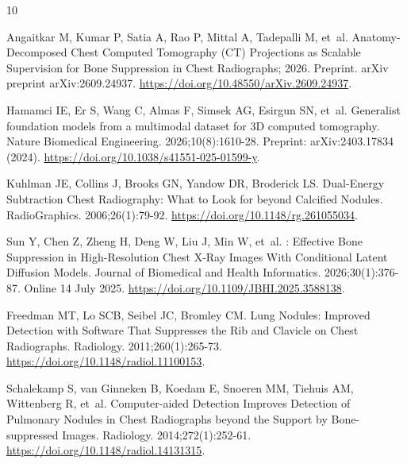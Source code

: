 \begin{thebibliography}{10}

Angaitkar M, Kumar P, Satia A, Rao P, Mittal A, Tadepalli M, et~al.
  Anatomy-Decomposed Chest Computed Tomography ({CT}) Projections as Scalable
  Supervision for Bone Suppression in Chest Radiographs; 2026.
\newblock Preprint.
\newblock arXiv preprint arXiv:2609.24937.
\newblock \url{https://doi.org/10.48550/arXiv.2609.24937}.

Hamamci IE, Er S, Wang C, Almas F, Simsek AG, Esirgun SN, et~al.
\newblock Generalist foundation models from a multimodal dataset for {3D}
  computed tomography.
\newblock Nature Biomedical Engineering. 2026;10(8):1610-28.
\newblock Preprint: arXiv:2403.17834 (2024).
\newblock \url{https://doi.org/10.1038/s41551-025-01599-y}.

Kuhlman JE, Collins J, Brooks GN, Yandow DR, Broderick LS.
\newblock Dual-Energy Subtraction Chest Radiography: What to Look for beyond
  Calcified Nodules.
\newblock RadioGraphics. 2006;26(1):79-92.
\newblock \url{https://doi.org/10.1148/rg.261055034}.

Sun Y, Chen Z, Zheng H, Deng W, Liu J, Min W, et~al.
: Effective Bone Suppression in High-Resolution Chest {X}-Ray
  Images With Conditional Latent Diffusion Models.
 Journal of Biomedical and Health Informatics.
  2026;30(1):376-87.
\newblock Online 14 July 2025.
\newblock \url{https://doi.org/10.1109/JBHI.2025.3588138}.

Freedman MT, Lo SCB, Seibel JC, Bromley CM.
\newblock Lung Nodules: Improved Detection with Software That Suppresses the
  Rib and Clavicle on Chest Radiographs.
\newblock Radiology. 2011;260(1):265-73.
\newblock \url{https://doi.org/10.1148/radiol.11100153}.

Schalekamp S, van Ginneken B, Koedam E, Snoeren MM, Tiehuis AM, Wittenberg R,
  et~al.
\newblock Computer-aided Detection Improves Detection of Pulmonary Nodules in
  Chest Radiographs beyond the Support by Bone-suppressed Images.
\newblock Radiology. 2014;272(1):252-61.
\newblock \url{https://doi.org/10.1148/radiol.14131315}.


\end{thebibliography}

